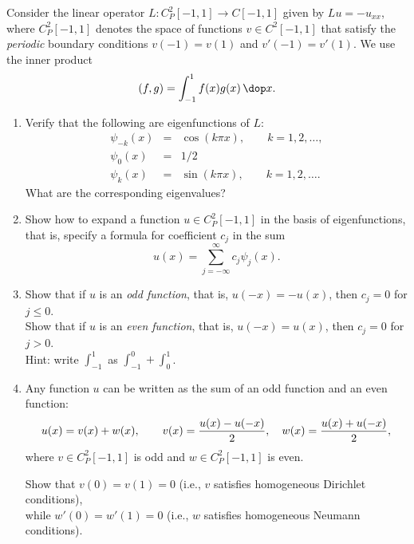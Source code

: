 Consider the linear operator $L:C^2_P[-1,1] \to C[-1,1]$
given by $Lu = -u_{xx}$,
where $C^2_P[-1,1]$ denotes the space of functions $v\in C^2[-1,1]$
that satisfy the \emph{periodic} boundary conditions $v(-1)=v(1)$ and $v'(-1)=v'(1)$.
We use the inner product
\[ (f,g) = \int_{-1}^1 f(x) g(x)\,\dop x.\]

\vspace*{1em}
\begin{enumerate}
\item Verify that the following are eigenfunctions of $L$:
\begin{eqnarray*}
    \psi_{-k}(x) &=& \cos(k \pi x), \qquad {k=1,2,\ldots, }\\[.5em]
    \psi_{0}(x) &=& 1/2 \\[.5em]
    \psi_{k}(x) &=& \sin(k \pi x), \qquad {k=1,2,\ldots. }
\end{eqnarray*}
What are the corresponding eigenvalues?  

\item Show how to expand a function $u \in C^2_P[-1,1]$ 
      in the basis of
      eigenfunctions, that is, specify a formula for coefficient $c_j$
      in the sum
      \[ u(x) = \sum_{j=-\infty}^\infty c_j \psi_j(x).\]
    
\item Show that if $u$ is an \emph{odd function}, that is, 
      $u(-x) = -u(x)$,
      then $c_j = 0$ for $j\le 0$.\\
      Show that if $u$ is an \emph{even function}, that is,
      $u(-x) = u(x)$, then $c_j = 0$ for $j>0$.\\[.25em]
      Hint: write $\int_{-1}^1$ as $\int_{-1}^0 + \int_0^1$.

\item Any function $u$ can be written as the sum of an odd function
      and an even function:
      \[ u(x) = v(x) + w(x), \qquad
         v(x) = {u(x) - u(-x)\over 2}, \quad
         w(x) = {u(x) + u(-x)\over 2},\]
      where $v\in C^2_P[-1,1]$ is odd 
      and $w\in C^2_P[-1,1]$ is even.

      Show that $v(0)=v(1)=0$ (i.e., $v$ satisfies homogeneous Dirichlet conditions), \\
      while $w'(0) = w'(1) = 0$ (i.e., $w$ satisfies homogeneous Neumann conditions). 

\end{enumerate}


